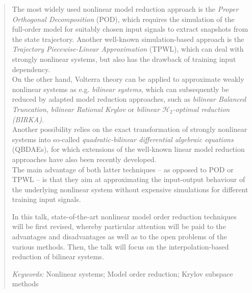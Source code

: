 \documentclass[11pt]{article}
\begin{document}
\begin{abstract}
The most widely used nonlinear model reduction approach is the \emph{Proper Orthogonal Decomposition} (POD), which requires the simulation of the full-order model for suitably chosen input signals to extract snapshots from the state trajectory. Another well-known simulation-based approach is the \emph{Trajectory Piecewise-Linear Approximation} (TPWL), which can deal with strongly nonlinear systems, but also has the drawback of training input dependency.\\
On the other hand, Volterra theory \cite{rugh1981nonlinear} can be applied to approximate weakly nonlinear systems as e.g. \emph{bilinear systems}, which can subsequently be reduced by adapted model reduction approaches, such as \emph{bilinear Balanced Truncation}, \emph{bilinear Rational Krylov} or \emph{bilinear $\mathcal{H}_2$-optimal reduction (BIRKA)}. \\
Another possibility relies on the exact transformation of strongly nonlinear systems into so-called \emph{quadratic-bilinear differential algebraic equations} (QBDAEs), for which extensions of the well-known linear model reduction approaches have also been recently developed. \\
The main advantage of both latter techniques -- as opposed to POD or TPWL -- is that they aim at approximating the input-output behaviour of the underlying nonlinear system without expensive simulations for different training input signals.


In this talk, state-of-the-art nonlinear model order reduction techniques will be first revised, whereby particular attention will be paid to the advantages and disadvantages as well as to the open problems of the various methods. Then, the talk will focus on the interpolation-based reduction of bilinear systems. 

\textit{Keywords:} Nonlinear systems; Model order reduction; Krylov subspace methods
\end{abstract}



\end{document}
